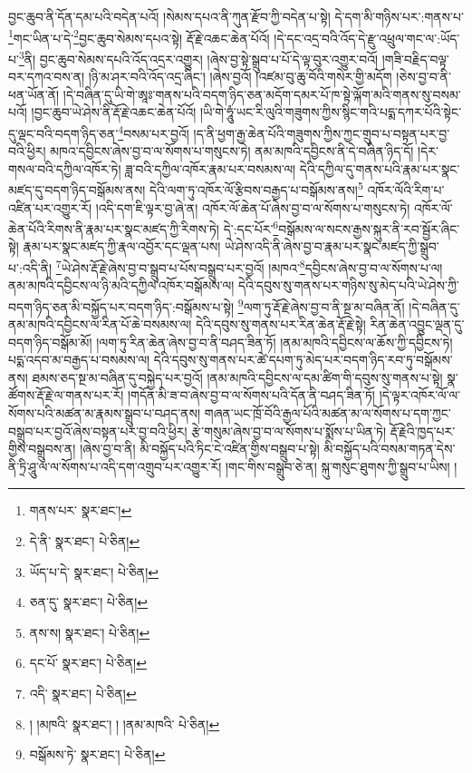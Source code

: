 བྱང་ཆུབ་ནི་དོན་དམ་པའི་བདེན་པའོ། །སེམས་དཔའ་ནི་ཀུན་རྫོབ་ཀྱི་བདེན་པ་སྟེ། དེ་དག་མི་གཉིས་པར་:གནས་པ་\footnote{གནས་པར་  སྣར་ཐང་། }གང་ཡིན་པ་དེ་\footnote{དེ་ནི་  སྣར་ཐང་།  པེ་ཅིན། }བྱང་ཆུབ་སེམས་དཔའ་སྟེ། རྡོ་རྗེ་འཆང་ཆེན་པོའོ། །དེ་དང་འདྲ་བའི་འོད་དེ་རྫུ་འཕྲུལ་གང་ལ་:ཡོད་པ་\footnote{ཡོད་པ་དེ་  སྣར་ཐང་།  པེ་ཅིན། }ནི། བྱང་ཆུབ་སེམས་དཔའི་འོད་འདྲར་འགྱུར། །ཞེས་བྱ་སྟེ་སྒྲུབ་པ་པོ་དེ་ལྟ་བུར་འགྱུར་བའོ། །གཟི་བརྗིད་བལྟ་བར་དཀའ་བས་ན། །ཉི་མ་ཤར་བའི་འོད་འདྲ་ཞིང་། །ཞེས་བྱའོ། །འཛམ་བུ་ཆུ་བོའི་གསེར་གྱི་མདོག །ཅེས་བྱ་བ་ནི་ཕན་ཡོན་ནོ། །དེ་བཞིན་དུ་ཡི་གེ་ཨཱཿ་གནས་པའི་བདག་ཉིད་ཅན་མདོག་དམར་པོ་ཁ་སྟེ་ལྐོག་མའི་གནས་སུ་བསམ་པའོ། །བྱང་ཆུབ་ཡེ་ཤེས་ནི་རྡོ་རྗེ་འཆང་ཆེན་པོའོ། །ཡི་གེ་ཧཱུཾ་ཡང་རི་ལུའི་གཟུགས་ཀྱིས་སྙིང་གའི་པདྨ་དཀར་པོའི་སྟེང་དུ་ལྡང་བའི་བདག་ཉིད་ཅན་\footnote{ཅན་དུ་  སྣར་ཐང་།  པེ་ཅིན། }བསམ་པར་བྱའོ། །ད་ནི་ཕྱག་རྒྱ་ཆེན་པོའི་གཟུགས་ཀྱིས་ཀྱང་གྲུབ་པ་བསྟན་པར་བྱ་བའི་ཕྱིར། མཁའ་དབྱིངས་ཞེས་བྱ་བ་ལ་སོགས་པ་གསུངས་ཏེ། ནམ་མཁའི་དབྱིངས་ནི་དེ་བཞིན་ཉིད་དོ། །དེར་གསལ་བའི་དཀྱིལ་འཁོར་ཏེ། ཟླ་བའི་དཀྱིལ་འཁོར་རྣམ་པར་བསམས་ལ། དེའི་དཀྱིལ་དུ་གནས་པའི་རྣམ་པར་སྣང་མཛད་དུ་བདག་ཉིད་བསྒོམས་ནས། དེའི་ལག་ཏུ་འཁོར་ལོ་རྩིབས་བརྒྱད་པ་བསྒོམས་ནས།\footnote{ནས་ས།  སྣར་ཐང་།  པེ་ཅིན། } འཁོར་ལོའི་རིག་པ་འཛིན་པར་འགྱུར་རོ། །འདི་དག་ཇི་ལྟར་བྱ་ཞེ་ན། འཁོར་ལོ་ཆེན་པོ་ཞེས་བྱ་བ་ལ་སོགས་པ་གསུངས་ཏེ། འཁོར་ལོ་ཆེན་པོའི་རིགས་ནི་རྣམ་པར་སྣང་མཛད་ཀྱི་རིགས་ཏེ། དེ་:དང་པོར་\footnote{དང་པོ་  སྣར་ཐང་།  པེ་ཅིན། }བསྒོམས་ལ་སངས་རྒྱས་སྐུར་ནི་རབ་སྦྱོར་ཞིང་སྟེ། རྣམ་པར་སྣང་མཛད་ཀྱི་རྣལ་འབྱོར་དང་ལྡན་པས། ཡེ་ཤེས་འདི་ནི་ཞེས་བྱ་བ་རྣམ་པར་སྣང་མཛད་ཀྱི་སྒྲུབ་པ་:འདི་ནི། \footnote{འདི་  སྣར་ཐང་།  པེ་ཅིན། }ཡེ་ཤེས་རྡོ་རྗེ་ཞེས་བྱ་བ་སྒྲུབ་པ་པོས་བསྒྲུབ་པར་བྱའོ། །མཁའ་\footnote{། །མཁའི་  སྣར་ཐང་། ། །ནམ་མཁའི་  པེ་ཅིན། }དབྱིངས་ཞེས་བྱ་བ་ལ་སོགས་པ་ལ། ནམ་མཁའི་དབྱིངས་ལ་ཉི་མའི་དཀྱིལ་འཁོར་བསྒོམས་ལ། དེའི་དབུས་སུ་གནས་པར་གཉིས་སུ་མེད་པའི་ཡེ་ཤེས་ཀྱི་བདག་ཉིད་ཅན་མི་བསྐྱོད་པར་བདག་ཉིད་:བསྒོམས་པ་སྟེ། \footnote{བསྒོམས་ཏེ་  སྣར་ཐང་།  པེ་ཅིན། }ལག་ཏུ་རྡོ་རྗེ་ཞེས་བྱ་བ་ནི་སྔ་མ་བཞིན་ནོ། །དེ་བཞིན་དུ་ནམ་མཁའི་དབྱིངས་ལ་རིན་པོ་ཆེ་བསམས་ལ། དེའི་དབུས་སུ་གནས་པར་རིན་ཆེན་རྡོ་རྗེ་སྟེ། རིན་ཆེན་འབྱུང་ལྡན་དུ་བདག་ཉིད་བསྒོམ་མོ། །ལག་ཏུ་རིན་ཆེན་ཞེས་བྱ་བ་ནི་བཤད་ཟིན་ཏོ། །ནམ་མཁའི་དབྱིངས་ལ་ཆོས་ཀྱི་དབྱིངས་ཏེ། པདྨ་འདབ་མ་བརྒྱད་པ་བསམས་ལ། དེའི་དབུས་སུ་གནས་པར་ཚེ་དཔག་ཏུ་མེད་པར་བདག་ཉིད་རབ་ཏུ་བསྒོམས་ནས། ཐམས་ཅད་སྔ་མ་བཞིན་དུ་བསྐྱེད་པར་བྱའོ། །ནམ་མཁའི་དབྱིངས་ལ་དམ་ཚིག་གི་དབུས་སུ་གནས་པ་སྟེ། སྣ་ཚོགས་རྡོ་རྗེ་ལ་གནས་པར་རོ། །གདོན་མི་ཟ་བ་ཞེས་བྱ་བ་ལ་སོགས་པའི་དོན་ནི་བཤད་ཟིན་ཏོ། །དེ་ལྟར་འཁོར་ལོ་ལ་སོགས་པའི་མཚན་མ་རྣམས་སྒྲུབ་པ་བཤད་ནས། གཞན་ཡང་ཁྲོ་བོའི་རྒྱལ་པོའི་མཚན་མ་ལ་སོགས་པ་དག་ཀྱང་བསྒྲུབ་པར་བྱའོ་ཞེས་བསྟན་པར་བྱ་བའི་ཕྱིར། རྩེ་གསུམ་ཞེས་བྱ་བ་ལ་སོགས་པ་སྨོས་པ་ཡིན་ཏེ། རྡོ་རྗེའི་ཁྱད་པར་གྱིས་བསྒྲུབས་ན། །ཞེས་བྱ་བ་ནི། མི་བསྐྱོད་པའི་ཏིང་ངེ་འཛིན་གྱིས་བསྒྲུབ་པ་སྟེ། མི་བསྐྱོད་པའི་བསམ་གཏན་དེས་ནི་ཏྲི་ཤཱུ་ལ་ལ་སོགས་པ་འདི་དག་འགྲུབ་པར་འགྱུར་རོ། །གང་གིས་བསྒྲུབ་ཅེ་ན། སྐུ་གསུང་ཐུགས་ཀྱི་སྒྲུབ་པ་ཡིས། །
